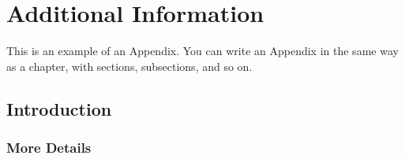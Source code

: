 
\section{Additional Information}
This is an example of an Appendix. You can write an Appendix in the same way as a chapter, with sections, subsections, and so on.

\subsection{Introduction}

\subsubsection{More Details}